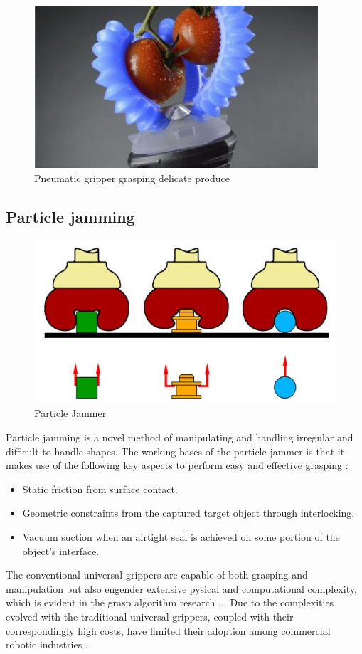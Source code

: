 \documentclass[11pt,twocolumn]{article}
\begin{document}
\begin{figure}[!h]
\centering
\includegraphics[scale=0.65]{gripped}
\caption{Pneumatic gripper grasping delicate produce}
\label{gripped}
\end{figure}
\subsection{Particle jamming}
\begin{figure}[!h]
\centering
\includegraphics[scale=0.65]{jammer1}
\caption{Particle Jammer}
\label{jammer1}
\end{figure}
\noindent
Particle jamming is a novel method of manipulating and handling irregular and difficult to handle shapes. The working bases of the particle jammer is that it makes use of the following key aspects to perform easy and effective grasping \cite{amend2012positive}:
\begin{itemize}
\item Static friction from surface contact.
\item Geometric constraints from the captured target object through interlocking.
\item Vacuum suction when an airtight seal is achieved on some portion of the object's interface.  
\end{itemize}
The conventional universal grippers are capable of both grasping and manipulation but also engender extensive pysical and computational complexity, which is evident in the grasp algorithm research \cite{miller2003automatic},\cite{shimoga1996robot},\cite{saxena2008robotic}. Due to the complexities evolved with the traditional universal grippers, coupled with their correspondingly high costs, have limited their adoption among commercial robotic industries \cite{amend2012positive}.
\end{document}
